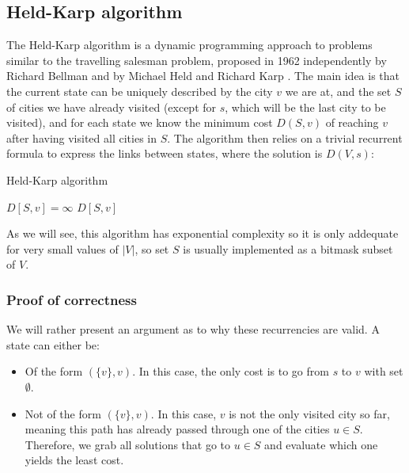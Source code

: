 \subsection{Held-Karp algorithm} \label{algorithm-tsp-heldkarp}
The Held-Karp algorithm is a dynamic programming approach to problems similar to the travelling salesman problem, proposed in 1962 independently by Richard Bellman \cite{bellman62} and by Michael Held and Richard Karp \cite{held-karp62}. The main idea is that the current state can be uniquely described by the city $v$ we are at, and the set $S$ of cities we have already visited (except for $s$, which will be the last city to be visited), and for each state we know the minimum cost $D(S,v)$ of reaching $v$ after having visited all cities in $S$. The algorithm then relies on a trivial recurrent formula to express the links between states, where the solution is $D(V, s)$:
\begin{algorithm}[H]
    \caption{Held-Karp algorithm}
    \label{alg:held-karp}
    \begin{algorithmic}[1]
         {$D[S,v]=\infty$}
        \EndFor
             \Return $D[S,v]$
            \EndIf
              
            \EndIf
                 
            \EndFor
            \State {}
        \EndFunction
    \end{algorithmic}
\end{algorithm}
As we will see, this algorithm has exponential complexity so it is only addequate for very small values of $|V|$, so set $S$ is usually implemented as a bitmask subset of $V$.
\subsubsection{Proof of correctness}
We will rather present an argument as to why these recurrencies are valid. A state can either be:
\begin{itemize}
    \item Of the form $(\{v\}, v)$. In this case, the only cost is to go from $s$ to $v$ with set $\emptyset$.
    \item Not of the form $(\{v\}, v)$. In this case, $v$ is not the only visited city so far, meaning this path has already passed through one of the cities $u \in S$. Therefore, we grab all solutions that go to $u \in S$ and evaluate which one yields the least cost.
\end{itemize}

